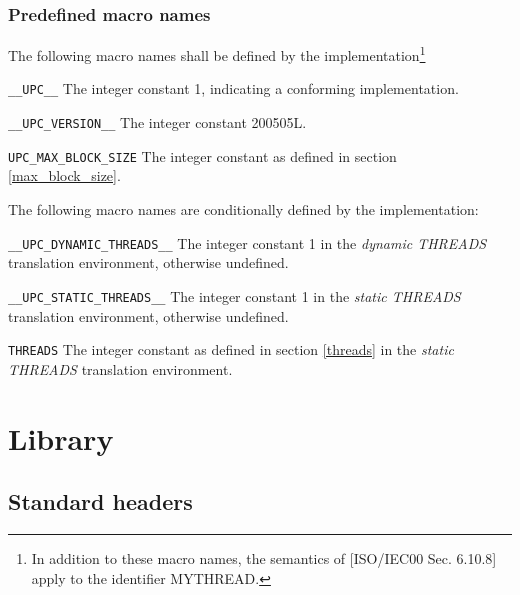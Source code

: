 \documentclass[12pt,titlepage]{article}
\newcounter{parnum}
\newcommand\np{\addtocounter{parnum}{1}\hspace{-2em}\makebox[2em][l]{\arabic{parnum}}}
\begin{document}
\subsubsection{Predefined macro names}

\np The following macro names shall be defined by the
    implementation\footnote{In addition to these macro names,
    the semantics of [ISO/IEC00 Sec. 6.10.8] apply to the identifier MYTHREAD.}

\begin{description}
\item {\tt \_\_UPC\_\_} 
The integer constant 1, indicating a conforming implementation.

\item{\tt \_\_UPC\_VERSION\_\_}
The integer constant 200505L.

\item{\tt UPC\_MAX\_BLOCK\_SIZE}
The integer constant as defined in section \ref{max_block_size}.
\end{description}

\np The following macro names are conditionally defined 
    by the implementation:

\begin{description}
\item {\tt \_\_UPC\_DYNAMIC\_THREADS\_\_} 
The integer constant 1 in the {\em dynamic THREADS} translation environment,
otherwise undefined.

\item{\tt \_\_UPC\_STATIC\_THREADS\_\_} 
The integer constant 1 in the {\em static THREADS} translation environment,
otherwise undefined.

\item{\tt THREADS}
The integer constant as defined in section \ref{threads} in the
{\em static THREADS} translation environment.

\end{description}

\pagebreak
\section{Library}
\subsection{Standard headers}
\end{document}
